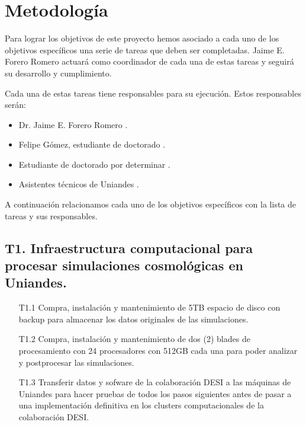 
\section{Metodolog\'ia}
\label{metodologia}

Para lograr los objetivos de este proyecto hemos asociado a cada uno
de los objetivos espec\'ificos una serie de tareas que deben ser
completadas. Jaime E. Forero Romero actuar\'a como coordinador de cada
una de estas tareas y seguir\'a su desarrollo y cumplimiento. 

Cada una de estas tareas tiene responsables para su ejecuci\'on. Estos
responsables ser\'an:

\begin{itemize}
\item Dr. Jaime E. Forero Romero  \prof.
\item Felipe G\'omez, estudiante de doctorado \gradA.
\item Estudiante de doctorado por determinar \gradB.
\item Asistentes t\'ecnicos de Uniandes \tecn.
\end{itemize}

A continuaci\'on relacionamos cada uno de los objetivos espec\'ificos
con la lista de tareas y sus responsables. 

\subsection*{T1. Infraestructura computacional para procesar simulaciones cosmol\'ogicas en Uniandes.} 
\begin{itemize}
\item[T1.1] \tecn 
Compra, instalaci\'on y mantenimiento de 5TB espacio de disco
  con backup para almacenar los datos originales de las simulaciones.
\item[T1.2] \tecn 
  Compra, instalaci\'on y mantenimiento de dos (2) blades de
  procesamiento con 24 procesadores con 512GB cada una para poder analizar y
  postprocesar las simulaciones.
\item[T1.3] \tecn\prof 
  Transferir datos y sofware de la colaboraci\'on
  DESI a las m\'aquinas de Uniandes para hacer pruebas de todos los
  pasos siguientes antes de pasar a una implementaci\'on definitiva en
  los clusters computacionales de la colaboraci\'on DESI. 
\end{itemize}

